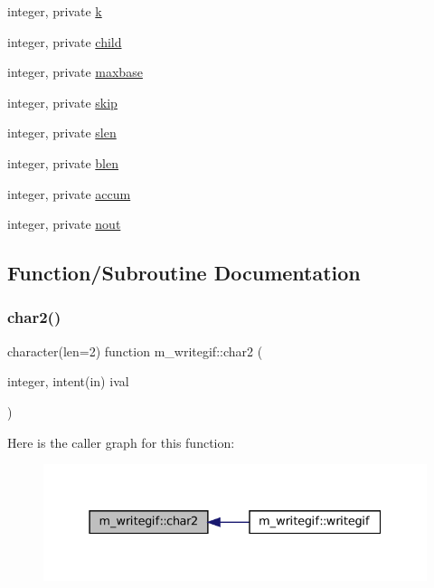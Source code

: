 \begin{DoxyCompactItemize}
\item 
integer, private \mbox{\hyperlink{namespacem__writegif_a29211b5bf371e3be08c3047bc80d3e91}{k}}
\item 
integer, private \mbox{\hyperlink{namespacem__writegif_a5e1b83b3bc6e486c730832371c48f6e0}{child}}
\item 
integer, private \mbox{\hyperlink{namespacem__writegif_ae052e1663af721294a611d19b300a8ef}{maxbase}}
\item 
integer, private \mbox{\hyperlink{namespacem__writegif_aaf7927ca24ee3d409138c18d7d254433}{skip}}
\item 
integer, private \mbox{\hyperlink{namespacem__writegif_ad3e590b43489ea5d2c357953adaca817}{slen}}
\item 
integer, private \mbox{\hyperlink{namespacem__writegif_add860aadf7250b3b589b697cc90fcccf}{blen}}
\item 
integer, private \mbox{\hyperlink{namespacem__writegif_a2a80a14e30c6ed2b0003d46a93480531}{accum}}
\item 
integer, private \mbox{\hyperlink{namespacem__writegif_a91b7b1d0dd2ced615d855f3440716415}{nout}}
\end{DoxyCompactItemize}


\subsection{Function/\+Subroutine Documentation}
\mbox{\label{namespacem__writegif_a79ebbfd4c7df8520a82c75c3a62f0c96}} 
\subsubsection{\texorpdfstring{char2()}{char2()}}
{\footnotesize\ttfamily character(len=2) function m\+\_\+writegif\+::char2 (\begin{DoxyParamCaption}\item[{integer, intent(in)}]{ival }\end{DoxyParamCaption})\hspace{0.3cm}{\ttfamily [private]}}

Here is the caller graph for this function\+:
\nopagebreak
\begin{figure}[H]
\begin{center}
\leavevmode
\includegraphics[width=331pt]{namespacem__writegif_a79ebbfd4c7df8520a82c75c3a62f0c96_icgraph}
\end{center}
\end{figure}
\mbox{\label{namespacem__writegif_a48c5ca5487be9dbe565c0d4f8aa02d0d}} 

